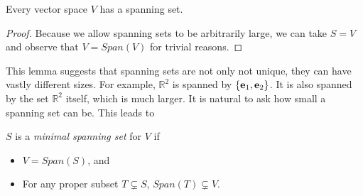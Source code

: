 \documentclass{ximera}
\begin{document}
\begin{lemma} Every vector space $V$ has a spanning set.
\end{lemma}

\begin{proof} Because we allow spanning sets to be arbitrarily large, we can take $S = V$ and observe that $V = Span(V)$ for trivial reasons.
\end{proof}

This lemma suggests that spanning sets are not only not unique, they can have vastly different sizes. For example, $\mathbb R^2$ is spanned by $\{{\bf e}_1, {\bf e}_2\}$. It is also spanned by the set $\mathbb R^2$ itself, which is much larger. It is natural to ask how small a spanning set can be. This leads to

\begin{definition} $S$ is a {\it minimal spanning set} for $V$ if
\begin{itemize} 
\item $V = Span(S)$, and
\item For any proper subset $T\subsetneq S$, $Span(T)\subsetneq V$.
\end{itemize}
\end{definition}
\end{document}
